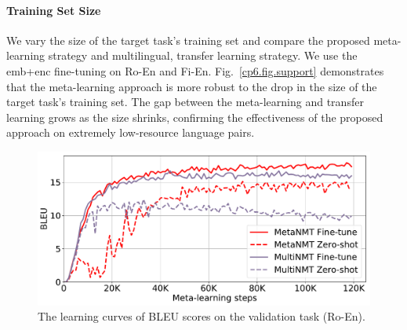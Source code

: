 

\paragraph{Training Set Size}

We vary the size of the target task's training set and compare the proposed meta-learning strategy and multilingual, transfer learning strategy. We use the emb+enc fine-tuning on Ro-En and Fi-En. Fig.~\ref{cp6.fig.support} demonstrates that the meta-learning approach is more robust to the drop in the size of the target task's training set. The gap between the meta-learning and transfer learning grows as the size shrinks, confirming the effectiveness of the proposed approach on extremely low-resource language pairs.

\begin{figure}[htpb]
    \centering
    \includegraphics[width=0.8\linewidth]{figs/meta/curve.pdf}
    \caption{The learning curves of BLEU scores on the validation task (Ro-En).}%
    \label{cp6.fig.train_curve}
\end{figure}

